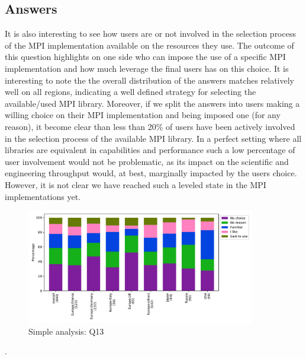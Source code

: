 
\subsection{Answers}


It is also interesting to see how users are or not involved in the selection process of the MPI implementation available on the resources they use. The outcome of this question highlights on one side who can impose the use of a specific MPI implementation and how much leverage the final users has on this choice. It is interesting to note the the overall distribution of the answers matches relatively well on all regions, indicating a well defined strategy for selecting the available/used MPI library. Moreover, if we split the answers into users making a willing choice on their MPI implementation and being imposed one (for any reason), it become clear than less than 20\% of users have been actively involved in the selection process of the available MPI library.
%
In a perfect setting where all libraries are equivalent in capabilities and performance such a low percentage of user involvement would not be problematic, as its impact on the scientific and engineering throughput would, at best, marginally impacted by the users choice. However, it is not clear we have reached such a leveled state in the MPI implementations yet.

\begin{figure}[htb]
\begin{center}
\includegraphics[width=10cm]{../pdfs/Q13.pdf}
\caption{Simple analysis: Q13}
\label{fig:Q13}
\end{center}
\end{figure}

.
